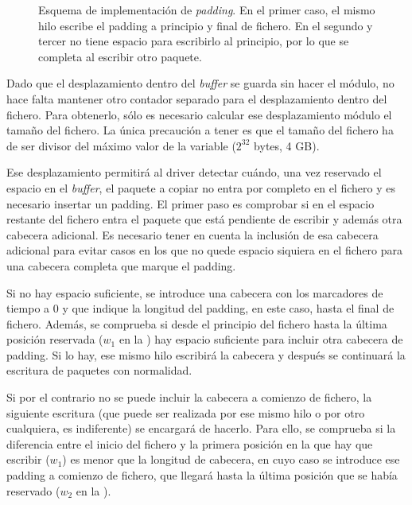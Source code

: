 \documentclass[oneside, draft]{epstfg}
\begin{document}
\begin{figure}[bp]
\centering

\caption[Esquema de implementación del \textit{padding} en el \textit{buffer} intermedio]{Esquema de implementación de \textit{padding}. En el primer caso, el mismo hilo escribe el \gls{padding} a principio y final de fichero. En el segundo y tercer no tiene espacio para escribirlo al principio, por lo que se completa al escribir otro paquete.}
\label{fig:BufferPadding}
\end{figure}

Dado que el desplazamiento dentro del \textit{buffer} se guarda sin hacer el módulo, no hace falta mantener otro contador separado para el desplazamiento dentro del fichero. Para obtenerlo, sólo es necesario calcular ese desplazamiento módulo el tamaño del fichero. La única precaución a tener es que el tamaño del fichero ha de ser divisor del máximo valor de la variable ($2^{32}$ bytes, 4 GB).

Ese desplazamiento permitirá al \gls{driver} detectar cuándo, una vez reservado el espacio en el \textit{buffer}, el paquete a copiar no entra por completo en el fichero y es necesario insertar un \gls{padding}. El primer paso es comprobar si en el espacio restante del fichero entra el paquete que está pendiente de escribir y además otra cabecera adicional. Es necesario tener en cuenta la inclusión de esa cabecera adicional para evitar casos en los que no quede espacio siquiera en el fichero para una cabecera completa que marque el \gls{padding}.

Si no hay espacio suficiente, se introduce una cabecera con los marcadores de tiempo a 0 y que indique la longitud del \gls{padding}, en este caso, hasta el final de fichero. Además, se comprueba si desde el principio del fichero hasta la última posición reservada ($w_1$ en la ) hay espacio suficiente para incluir otra cabecera de \gls{padding}. Si lo hay, ese mismo hilo escribirá la cabecera y después se continuará la escritura de paquetes con normalidad.

Si por el contrario no se puede incluir la cabecera a comienzo de fichero, la siguiente escritura (que puede ser realizada por ese mismo hilo o por otro cualquiera, es indiferente) se encargará de hacerlo. Para ello, se comprueba si la diferencia entre el inicio del fichero y la primera posición en la que hay que escribir ($w_1$) es menor que la longitud de cabecera, en cuyo caso se introduce ese \gls{padding} a comienzo de fichero, que llegará hasta la última posición que se había reservado ($w_2$ en la ).
\end{document}
